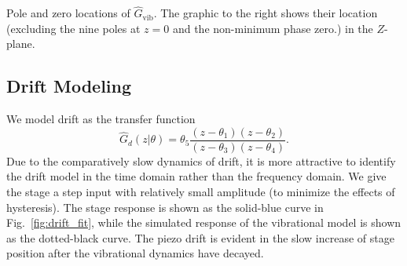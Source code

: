 \documentclass[twocolumn,twoside]{IEEEtran}
\newcommand{\Gv}{\ensuremath{G_{\text{vib}}}\xspace}
\begin{document}
\begin{table}
  \caption{Pole and zero locations of $\hat{G}_{\textrm{vib}}$. The graphic to the right shows their location (excluding the nine poles at $z=0$ and the non-minimum phase zero.) in the $Z$-plane.}
  \label{tab:pzgvib}
  \begin{minipage}[T]{.6\linewidth}
    \small
    
\end{minipage}%
\begin{minipage}[T]{.3\linewidth}
  
\end{minipage}
\end{table}


\subsection{Drift Modeling}\label{sec:drift_model}
We model drift as the transfer function
\begin{equation}
\hat{G}_d(z|\theta) = \theta_5\frac{(z-\theta_1)(z-\theta_2)}{(z-\theta_3)(z-\theta_4)}.\nonumber
\end{equation}
Due to the comparatively slow dynamics of drift, it is more attractive to identify the drift model in the time domain rather than the frequency domain. 
We give the stage a step input with relatively small amplitude (to minimize the effects of hysteresis). The stage response is shown as the solid-blue curve in Fig.~\ref{fig:drift_fit}, while the simulated response of the vibrational model is shown as the dotted-black curve. The piezo drift is evident in the slow increase of stage position after the vibrational dynamics have decayed. 
\end{document}
